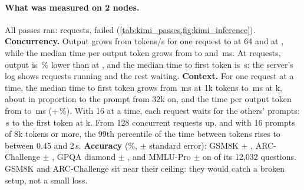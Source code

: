 \paragraph{What was measured on 2 nodes.} All \TriKimiPasses{} passes ran: \TriKimiRequests{} requests, \TriKimiFailed{} failed (\cref{tab:kimi_passes,fig:kimi_inference}). \textbf{Concurrency.} Output grows from \TriKimiOneTok{} tokens/s for one request to \TriKimiSixtyFourTok{} at 64 and \TriKimiPeakTok{} at \TriKimiPeakConc, while the median time per output token grows from \TriKimiOneTpot{} to \TriKimiSixtyFourTpot{} and \TriKimiPeakTpot\,ms. At \TriKimiTopConc{} requests, output is \TriKimiTopPct\,\% lower than at \TriKimiPeakConc, and the median time to first token is \TriKimiTopTtft\,s: the server's log shows \TriKimiMaxSeqs{} requests running and the rest waiting. \textbf{Context.} For one request at a time, the median time to first token grows from \TriKimiCtxOneTtft\,ms at 1k tokens to \TriKimiCtxTtft\,ms at \TriKimiCtxTopK k, about in proportion to the prompt from 32k on, and the time per output token from \TriKimiCtxOneTpot{} to \TriKimiCtxTpot\,ms (+\TriKimiCtxTpotPct\,\%). With 16 at a time, each request waits for the others' prompts: \TriKimiCtxSixteenTtft\,s to the first token at \TriKimiCtxTopK k. From 128 concurrent requests up, and with 16 prompts of 8k tokens or more, the 99th percentile of the time between tokens rises to between 0.45 and 2\,s. \textbf{Accuracy} (\%, $\pm$ standard error): GSM8K \TriKimiGsm{} $\pm$ \TriKimiGsmErr, ARC-Challenge \TriKimiArc{} $\pm$ \TriKimiArcErr, GPQA diamond \TriKimiGpqa{} $\pm$ \TriKimiGpqaErr, and MMLU-Pro \TriKimiMmlu{} $\pm$ \TriKimiMmluErr{} on \TriKimiMmluN{} of its 12,032 questions. GSM8K and ARC-Challenge sit near their ceiling: they would catch a broken setup, not a small loss.

